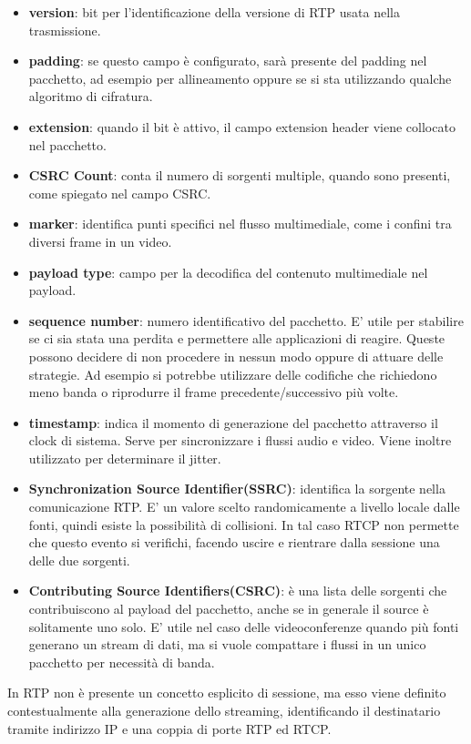 \begin{itemize}
	\item \textbf{version}: bit per l'identificazione della versione di RTP usata nella trasmissione. 
	\item \textbf{padding}: se questo campo è configurato, sarà presente del padding nel pacchetto, ad esempio per allineamento oppure se si sta utilizzando qualche algoritmo di cifratura. 
	\item \textbf{extension}: quando il bit è attivo, il campo extension header viene collocato nel pacchetto. 
	\item \textbf{CSRC Count}: conta il numero di sorgenti multiple, quando sono presenti, come spiegato nel campo CSRC. 
	\item \textbf{marker}: identifica punti specifici nel flusso multimediale, come i confini tra diversi frame in un video.
	\item \textbf{payload type}: campo per la decodifica del contenuto multimediale nel payload.
	\item \textbf{sequence number}: numero identificativo del pacchetto. E' utile per stabilire se ci sia stata una perdita e permettere alle applicazioni di reagire. Queste possono decidere di non procedere in nessun modo oppure di attuare delle strategie. Ad esempio si potrebbe utilizzare delle codifiche che richiedono meno banda o riprodurre il frame precedente/successivo più volte.
	\item \textbf{timestamp}: indica il momento di generazione del pacchetto attraverso il clock di sistema. Serve per sincronizzare i flussi audio e video. Viene inoltre utilizzato per determinare il jitter.
	\item \textbf{Synchronization Source Identifier(SSRC)}: identifica la sorgente nella comunicazione RTP. E' un valore scelto randomicamente a livello locale dalle fonti, quindi esiste la possibilità di collisioni. In tal caso RTCP non permette che questo evento si verifichi, facendo uscire e rientrare dalla sessione una delle due sorgenti.
	\item \textbf{Contributing Source Identifiers(CSRC)}: è una lista delle sorgenti che contribuiscono al payload del pacchetto, anche se in generale il source è solitamente uno solo. E' utile nel caso delle videoconferenze quando più fonti generano un stream di dati, ma si vuole compattare i flussi in un unico pacchetto per necessità di banda. 
\end{itemize}

In RTP non è presente un concetto esplicito di sessione, ma esso viene definito contestualmente alla generazione dello streaming, identificando il destinatario tramite indirizzo IP e una coppia di porte RTP ed RTCP. %

